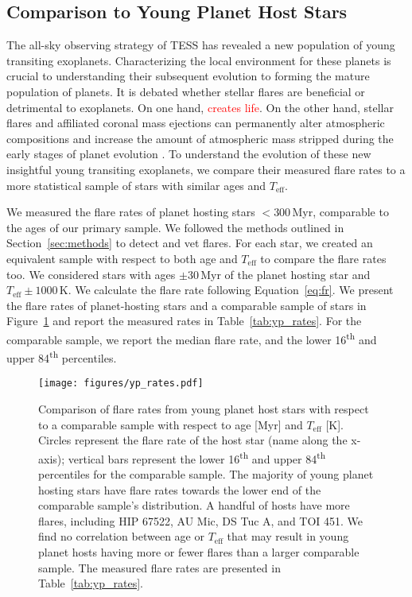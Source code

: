 \documentclass[twocolumn]{aastex631}
\begin{document}
\subsection{Comparison to Young Planet Host Stars}

The all-sky observing strategy of TESS has revealed a new population of young transiting exoplanets.
Characterizing the local environment for these planets is crucial to understanding their subsequent evolution
to forming the mature population of planets. It is debated whether stellar flares are beneficial or detrimental
to exoplanets. On one hand, \textcolor{red}{creates life}. On the other hand, stellar flares and affiliated
coronal mass ejections can permanently alter atmospheric compositions \citep{chen21} and increase the amount of
atmospheric mass stripped during the early stages of planet evolution \citep{feinstein20}. To understand the
evolution of these new insightful young transiting exoplanets, we compare their measured flare rates to a more
statistical sample of stars with similar ages and $T_\textrm{eff}$.

We measured the flare rates of planet hosting stars $< 300$\,Myr, comparable to the ages of our primary sample.
We followed the methods outlined in Section~\ref{sec:methods} to detect and vet flares. For each star, we created
an equivalent sample with respect to both age and $T_\textrm{eff}$ to compare the flare rates too. We considered
stars with ages $\pm 30$\,Myr of the planet hosting star and $T_\textrm{eff} \pm 1000$\,K. We calculate the flare rate
following Equation~\ref{eq:fr}. We present
the flare rates of planet-hosting stars and a comparable sample of stars in Figure~\ref{fig:yp_rates}
and report the measured rates in Table~\ref{tab:yp_rates}. For the comparable sample, we report the
median flare rate, and the lower 16\textsuperscript{th} and upper 84\textsuperscript{th} percentiles.

\begin{figure}[ht!]
    \begin{centering}
        \texttt{[image: figures/yp\_rates.pdf]}
        \caption{
            Comparison of flare rates from young planet host stars with respect to
            a comparable sample with respect to age [Myr] and $T_\textrm{eff}$ [K].
            Circles represent the flare rate of the host star (name along the x-axis);
            vertical bars represent the lower 16\textsuperscript{th} and upper
            84\textsuperscript{th} percentiles for the comparable sample. The majority
            of young planet hosting stars have flare rates towards the lower end of the
            comparable sample's distribution. A handful of hosts have more flares, including
            HIP 67522, AU Mic, DS Tuc A, and TOI 451. We find no correlation between
            age or $T_\textrm{eff}$ that may result in young planet hosts having more or fewer
            flares than a larger comparable sample. The measured flare rates are presented in
            Table~\ref{tab:yp_rates}.
        }
        \label{fig:yp_rates}
    \end{centering}
\end{figure}
\end{document}
